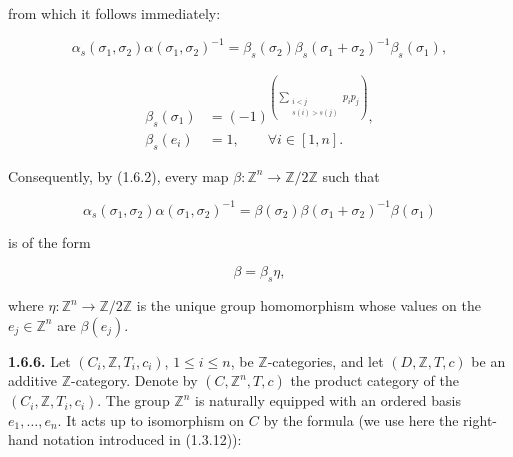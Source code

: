 %
from which it follows immediately:

\begin{equation*}
  \alpha_s(\sigma_1,\sigma_2)\alpha(\sigma_1,\sigma_2)^{-1}
  =\beta_s(\sigma_2)\beta_s(\sigma_1+\sigma_2)^{-1}\beta_s(\sigma_1),
\end{equation*}

\begin{equation}
  \begin{aligned}
    \beta_s(\sigma_1)
      &=(-1)^{\left(
          \sum_{\substack{i<j\\s(i)>s(j)}}p_i p_j
        \right)},\\
    \beta_s(e_i)&=1,
      \qquad \forall i\in[1,n].
  \end{aligned}
  \tag{1.6.5.3}
\end{equation}

Consequently, by (1.6.2), every map
$\beta\colon\mathbb Z^n\longrightarrow\mathbb Z/2\mathbb Z$ such that

\begin{equation}
  \alpha_s(\sigma_1,\sigma_2)\alpha(\sigma_1,\sigma_2)^{-1}
  =\beta(\sigma_2)\beta(\sigma_1+\sigma_2)^{-1}\beta(\sigma_1)
  \tag{1.6.5.4}
\end{equation}

is of the form

\begin{equation}
  \beta=\beta_s\eta,
  \tag{1.6.5.5}
\end{equation}

where $\eta\colon\mathbb Z^n\longrightarrow\mathbb Z/2\mathbb Z$ is
the unique group homomorphism whose values on the
$e_j\in\mathbb Z^n$ are $\beta(e_j)$.

\noindent\textbf{1.6.6.}\quad
Let $(C_i,\mathbb Z,T_i,c_i)$, $1\leq i\leq n$, be
$\mathbb Z$-categories, and let $(D,\mathbb Z,T,c)$ be an additive
$\mathbb Z$-category. Denote by $(C,\mathbb Z^n,T,c)$ the product
category of the $(C_i,\mathbb Z,T_i,c_i)$. The group $\mathbb Z^n$ is
naturally equipped with an ordered basis $e_1,\ldots,e_n$. It acts up
to isomorphism on $C$ by the formula (we use here the right-hand
notation introduced in (1.3.12)):

